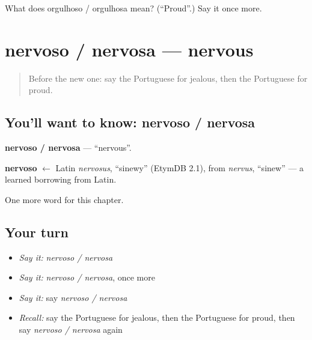 \begin{tcolorbox}[breakable,colback=teal!4,colframe=teal!35!black,title={Before you move on}]
What does orgulhoso / orgulhosa mean? (\textquotedblleft{}Proud\textquotedblright{}.) Say it once more.
\end{tcolorbox}
\section[nervoso / nervosa]{nervoso / nervosa — nervous}

\label{lesson:PT-C215-nervoso-nervosa}



\begin{quote}
Before the new one: say the Portuguese for jealous, then the Portuguese for proud.
\end{quote}

\subsection*{You'll want to know: nervoso / nervosa}
\textbf{nervoso / nervosa} — \textquotedblleft{}nervous\textquotedblright{}.

\begin{cousinweb}
\textbf{nervoso} $\leftarrow$ Latin \emph{nervosus}, \textquotedblleft{}sinewy\textquotedblright{} (EtymDB 2.1), from \emph{nervus}, \textquotedblleft{}sinew\textquotedblright{} — a learned borrowing from Latin.
\end{cousinweb}

\begin{grammarlens}[title={What you've built}]
One more word for this chapter.
\end{grammarlens}

\subsection*{Your turn}
\begin{itemize}
\raggedright
  \item \emph{Say it:} \emph{nervoso / nervosa}
  \item \emph{Say it:} \emph{nervoso / nervosa}, once more
  \item \emph{Say it:} say \emph{nervoso / nervosa}
  \item \emph{Recall:} say the Portuguese for jealous, then the Portuguese for proud, then say \emph{nervoso / nervosa} again
\end{itemize}

